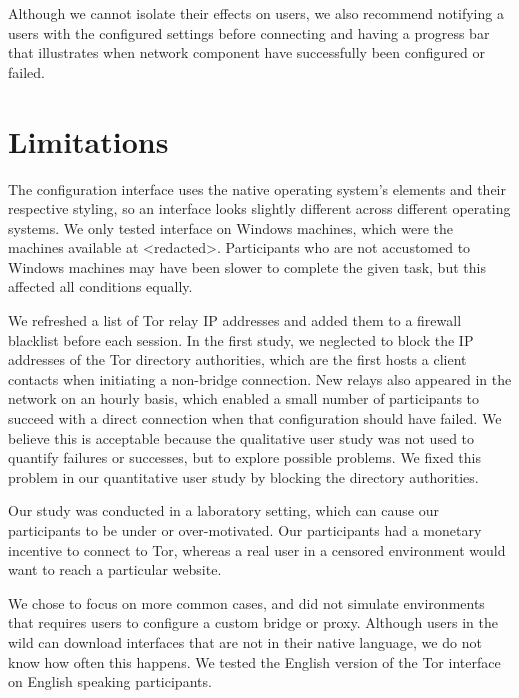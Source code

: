 \documentclass[USenglish,oneside,twocolumn]{article}
\begin{document}
Although we cannot isolate their effects on users, we also recommend notifying a users with the configured settings before connecting and having a progress bar that illustrates when network component have successfully been configured or failed.

\section{Limitations} 
The configuration interface uses the native operating system's elements and their respective styling, so an interface looks slightly different across different operating systems. We only tested interface on Windows machines, which were the machines available at <redacted>. %
Participants who are not accustomed to Windows machines may have been slower to complete the given task, but this affected all conditions equally. 

We refreshed a list of Tor relay IP addresses and added them
to a firewall blacklist before each session.
In the first study, we neglected to block the IP addresses
of the Tor directory authorities, which are the first hosts
a client contacts when initiating a non-bridge connection.
New relays also appeared in the network on an hourly basis,
which enabled a small number of participants to succeed with
a direct connection when that configuration should have failed.
We believe this is acceptable because 
the qualitative user study was not used to quantify failures or successes, 
but to explore possible problems.
We fixed this problem in our quantitative user study by blocking the directory authorities.


Our study was conducted in a laboratory setting, which can cause our participants to be under or over-motivated. Our participants had a monetary incentive to connect to Tor, whereas a real user in a censored environment would want to reach a particular website. 

We chose to focus on more common cases, and did not simulate environments that requires users to configure a custom bridge or proxy. Although users in the wild can download interfaces that are not in their native language, we do not know how often this happens. We tested the English version of the Tor interface on English speaking participants. 
\end{document}
